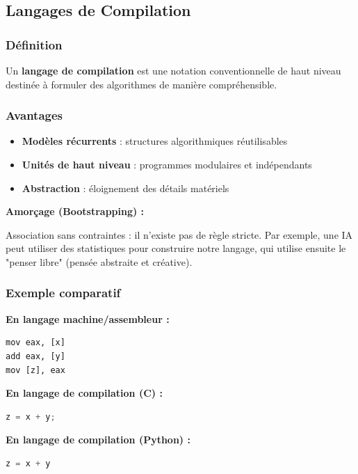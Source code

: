 \documentclass[12pt,a4paper]{article}
\begin{document}
\newpage
\subsection{Langages de Compilation}

\subsubsection{Définition}

\begin{definition}
Un \textbf{langage de compilation} est une notation conventionnelle de haut niveau destinée à formuler des algorithmes de manière compréhensible. 
\end{definition}

\subsubsection{Avantages}

\begin{important}
\begin{itemize}
    \item \textcolor{titrebleu}{\textbf{Modèles récurrents}} : structures algorithmiques réutilisables
    \item \textcolor{defvert}{\textbf{Unités de haut niveau}} : programmes modulaires et indépendants
    \item \textcolor{algoviolet}{\textbf{Abstraction}} : éloignement des détails matériels
\end{itemize}
\end{important}

\begin{notecours}
\textbf{Amorçage (Bootstrapping) :}

Association sans contraintes : il n'existe pas de règle stricte.  Par exemple, une IA peut utiliser des statistiques pour construire notre langage, qui utilise ensuite le "penser libre" (pensée abstraite et créative).
\end{notecours}

\subsubsection{Exemple comparatif}

\begin{exemple}
\textbf{En langage machine/assembleur :}
\begin{lstlisting}[language={[x86masm]Assembler}]
mov eax, [x]
add eax, [y]
mov [z], eax
\end{lstlisting}

\textbf{En langage de compilation (C) :}
\begin{lstlisting}[language=C]
z = x + y;
\end{lstlisting}

\textbf{En langage de compilation (Python) :}
\begin{lstlisting}[language=Python]
z = x + y
\end{lstlisting}
\end{exemple}
\end{document}
